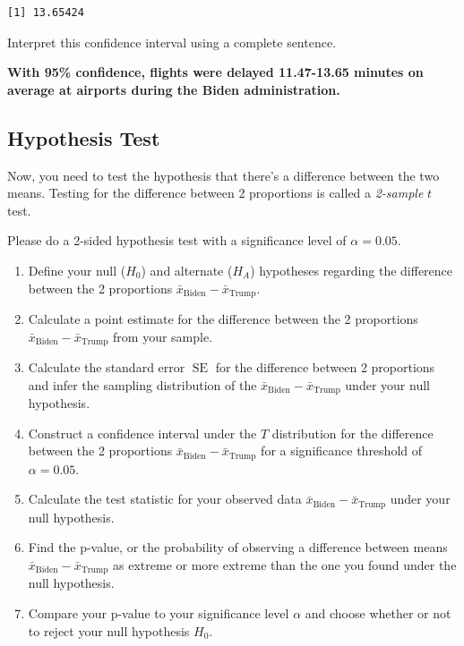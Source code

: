\documentclass[
  letterpaper,
  DIV=11,
  numbers=noendperiod]{scrartcl}
\begin{document}
\begin{verbatim}
[1] 13.65424
\end{verbatim}

Interpret this confidence interval using a complete sentence.

\begin{tcolorbox}[enhanced jigsaw, toprule=.15mm, breakable, leftrule=.75mm, bottomrule=.15mm, rightrule=.15mm, colback=white, opacityback=0, colframe=quarto-callout-warning-color-frame, left=2mm, arc=.35mm]

\textbf{With 95\% confidence, flights were delayed 11.47-13.65 minutes
on average at airports during the Biden administration.}

\end{tcolorbox}

\subsection{Hypothesis Test}\label{hypothesis-test-1}

Now, you need to test the hypothesis that there's a difference between
the two means. Testing for the difference between 2 proportions is
called a \emph{2-sample} \(t\) test.

Please do a 2-sided hypothesis test with a significance level of
\(\alpha=0.05\).

\begin{enumerate}
\def\labelenumi{\arabic{enumi}.}
\item
  Define your null (\(H_0\)) and alternate (\(H_A\)) hypotheses
  regarding the difference between the 2 proportions
  \(\bar{x}_{\text{Biden}}-\bar{x}_{\text{Trump}}\).
\item
  Calculate a point estimate for the difference between the 2
  proportions \(\bar{x}_{\text{Biden}}-\bar{x}_{\text{Trump}}\) from
  your sample.
\item
  Calculate the standard error \(\operatorname{SE}\) for the difference
  between 2 proportions and infer the sampling distribution of the
  \(\bar{x}_{\text{Biden}}-\bar{x}_{\text{Trump}}\) under your null
  hypothesis.
\item
  Construct a confidence interval under the \(T\) distribution for the
  difference between the 2 proportions
  \(\bar{x}_{\text{Biden}}-\bar{x}_{\text{Trump}}\) for a significance
  threshold of \(\alpha=0.05\).
\item
  Calculate the test statistic for your observed data
  \(\bar{x}_{\text{Biden}}-\bar{x}_{\text{Trump}}\) under your null
  hypothesis.
\item
  Find the p-value, or the probability of observing a difference between
  means \(\bar{x}_{\text{Biden}}-\bar{x}_{\text{Trump}}\) as extreme or
  more extreme than the one you found under the null hypothesis.
\item
  Compare your p-value to your significance level \(\alpha\) and choose
  whether or not to reject your null hypothesis \(H_0\).
\end{enumerate}
\end{document}
